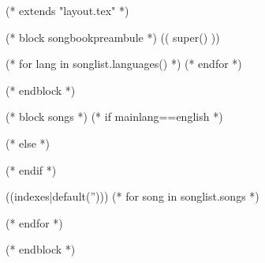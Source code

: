(* extends "layout.tex" *)

(* block songbookpreambule *)
   (( super() ))

   (* for lang in songlist.languages() *)
   (* endfor *)
   \usepackage[((lang))]{babel}

   \graphicspath{{((datadir))/img/}}
(* endblock *)

(* block songs *)
   (* if mainlang==english *)
   (* else *)
   (* endif *)

   \begin{songs}{((indexes|default('')))}
      (* for song in songlist.songs *)
      
      (* endfor *)
   \end{songs}
(* endblock *)
